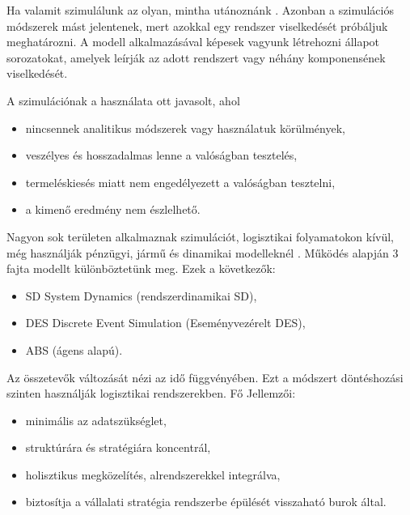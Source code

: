




Ha valamit szimulálunk az olyan, mintha utánoznánk \cite{szim}. Azonban a szimulációs módszerek mást jelentenek, mert azokkal egy rendszer viselkedését próbáljuk meghatározni. A modell alkalmazásával képesek vagyunk létrehozni állapot sorozatokat, amelyek leírják az adott rendszert vagy néhány komponensének viselkedését. 

A szimulációnak a használata ott javasolt, ahol

\begin{itemize}
	\item nincsennek analitikus módszerek vagy használatuk körülmények,
	\item veszélyes és hosszadalmas lenne a valóságban tesztelés,
	\item termeléskiesés miatt nem engedélyezett a valóságban tesztelni,
	\item a kimenő eredmény nem észlelhető.
\end{itemize}

Nagyon sok területen alkalmaznak szimulációt, logisztikai folyamatokon kívül, még használják pénzügyi, jármű és dinamikai modelleknél \cite{szim2}. 
Működés alapján 3 fajta modellt különböztetünk meg. Ezek a következők:
\begin{itemize}
	\item SD System Dynamics (rendszerdinamikai SD),
	\item  DES Discrete Event Simulation (Eseményvezérelt DES),
	\item  ABS (ágens alapú).
\end{itemize}


Az összetevők változását nézi az idő függvényében. Ezt a módszert döntéshozási szinten használják logisztikai rendszerekben. 
Fő Jellemzői:

\begin{itemize}
	\item minimális az adatszükséglet,
	\item  struktúrára és stratégiára koncentrál,
	\item  holisztikus megközelítés, alrendszerekkel integrálva,
	\item biztosítja a vállalati stratégia rendszerbe épülését visszaható burok által.
\end{itemize}

